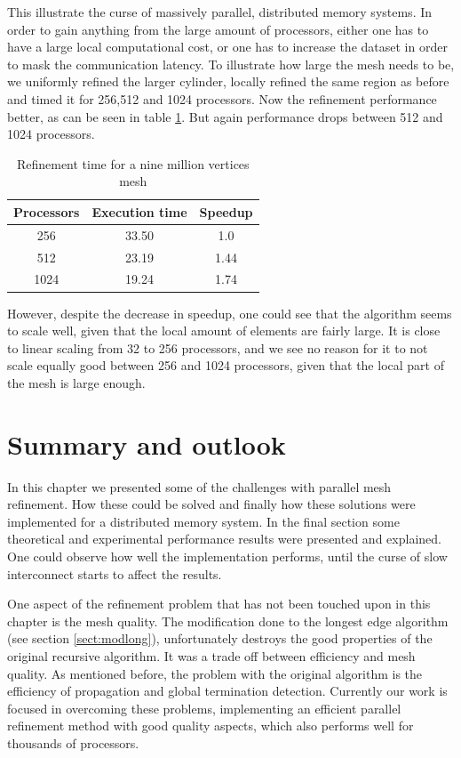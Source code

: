 This illustrate the curse of massively parallel, distributed memory
systems. In order to gain anything from the large amount of
processors, either one has to have a large local computational cost,
or one has to increase the dataset in order to mask the communication
latency. To illustrate how large the mesh needs to be, we uniformly
refined the larger cylinder, locally refined the same region as before
and timed it for 256,512 and 1024 processors. Now the refinement
performance better, as can be seen in table \ref{tab:reftime}. But
again performance drops between 512 and 1024 processors.
\begin{table}[t]
  \begin{center}
    \begin{tabular}{|c|c|c|}
      \hline
      Processors & Execution time & Speedup \\
      \hline
      256 & 33.50 & 1.0 \\
      512 & 23.19 & 1.44 \\
      1024 & 19.24 & 1.74 \\
      \hline
    \end{tabular}
  \end{center}
  \caption{\label{tab:reftime} Refinement time for a nine million vertices mesh}
\end{table}

However, despite the decrease in speedup, one could see that the
algorithm seems to scale well, given that the local amount of elements
are fairly large. It is close to linear scaling from 32 to 256
processors, and we see no reason for it to not scale equally good
between 256 and 1024 processors, given that the local part of the mesh
is large enough.

\section{Summary and outlook}

In this chapter we presented some of the challenges with parallel mesh
refinement. How these could be solved and finally how these solutions
were implemented for a distributed memory system. In the final section
some theoretical and experimental performance results were presented
and explained. One could observe how well the implementation performs,
until the curse of slow interconnect starts to affect the results.

One aspect of the refinement problem that has not been touched upon in
this chapter is the mesh quality. The modification done to the longest
edge algorithm (see section \ref{sect:modlong}), unfortunately
destroys the good properties of the original recursive algorithm. It
was a trade off between efficiency and mesh quality. As mentioned
before, the problem with the original algorithm is the efficiency of
propagation and global termination detection. Currently our work is
focused in overcoming these problems, implementing an efficient
parallel refinement method with good quality aspects, which also
performs well for thousands of processors.

